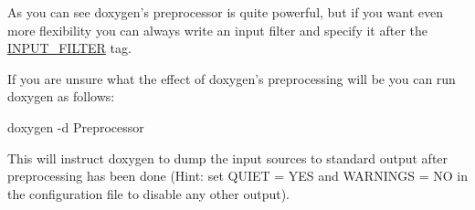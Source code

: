 As you can see doxygen's preprocessor is quite powerful, but if you want even more flexibility you can always write an input filter and specify it after the \hyperlink{config_cfg_input_filter}{INPUT\_\-FILTER} tag.

If you are unsure what the effect of doxygen's preprocessing will be you can run doxygen as follows: \begin{DoxyVerb}
  doxygen -d Preprocessor
\end{DoxyVerb}
 This will instruct doxygen to dump the input sources to standard output after preprocessing has been done (Hint: set {\ttfamily QUIET = YES} and {\ttfamily WARNINGS = NO} in the configuration file to disable any other output).

 